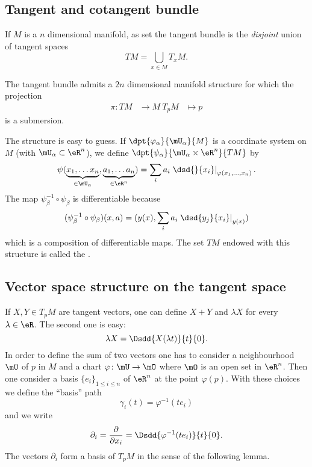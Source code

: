 \subsection{Tangent and cotangent bundle}

If $M$ is a $n$ dimensional manifold, as set the tangent bundle is the \emph{disjoint} union of tangent spaces
\[
  TM=\bigcup_{x\in M}T_xM.
\]

\begin{theorem}
	The tangent bundle admits a $2n$ dimensional manifold structure for which the projection
	\begin{equation}
		\begin{aligned}
			\pi \colon TM &\to M\
			T_pM&\mapsto p
		\end{aligned}
	\end{equation}
	is a submersion.
\end{theorem}

The structure is easy to guess. If $\dpt{\varphi_{\alpha}}{\mU_{\alpha}}{M}$ is a coordinate system on $M$ (with $\mU_{\alpha}\subset\eR^n$), we define $\dpt{\psi_{\alpha}}{\mU_{\alpha}\times \eR^n}{TM}$ by
\[
  \psi( \underbrace{x_1,\ldots x_n}_{\in\mU_{\alpha}},\underbrace{a_1,\ldots a_n}_{\in\eR^n}  )
          =\sum_i a_i\left.\dsd{}{x_i}\right|_{\varphi(x_1,\ldots,x_n)}.
\]
The map $\psi_{\beta}^{-1}\circ\psi_{\beta}$ is differentiable because
\[
(\psi_{\beta}^{-1}\circ\psi_{\beta})(x,a)=( y(x),\sum_i a_i\left.\dsd{y_j}{x_i}\right|_{y(x)}  )
\]
which is a composition of differentiable maps. The set $TM$ endowed with this structure is called the .

\subsection{Vector space structure on the tangent space}

If \( X,Y\in T_pM\) are tangent vectors, one can define \( X+Y\) and \( \lambda X\) for every \( \lambda\in\eR\). The second one is easy:
\begin{equation}
    \lambda X=\Dsdd{ X(\lambda t) }{t}{0}.
\end{equation}
In order to define the sum of two vectors one has to consider a neighbourhood \( \mU\) of \( p\) in \( M\) and a chart \( \varphi\colon \mU\to \mO\) where \( \mO\) is an open set in \( \eR^n\). Then one consider a basis \( \{ e_i \}_{1\leq i\leq n}\) of \( \eR^n\) at the point \( \varphi(p)\). With these choices we define the ``basis'' path
\begin{equation}
    \gamma_i(t)=\varphi^{-1}(te_i)
\end{equation}
and we write
\begin{equation}
    \partial_i=\frac{ \partial  }{ \partial x_i }=\Dsdd{ \varphi^{-1}(te_i) }{t}{0}.
\end{equation}
The vectors \( \partial_i\) form a basis of \( T_pM\) in the sense of the following lemma.


